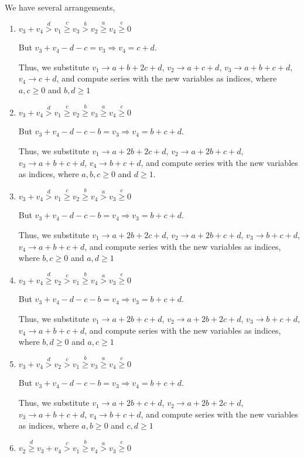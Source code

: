\documentclass{article}
\begin{document}
We have several arrangements,
\begin{enumerate}
    \item 
$v_3+v_4\overset{d}{>}v_1\overset{c}{\geq}v_3\overset{b}{>}{v_2}\overset{a}{\geq}v_4\overset{e}{\geq}{0}$

But $v_3+v_4-d-c=v_3\Rightarrow{v_4=c+d}.$

Thus, we substitute $v_1\rightarrow{a+b+2c+d}$, $v_2\rightarrow{a+c+d}$, $v_3\rightarrow{a+b+c+d}$, $v_4\rightarrow{c+d}$, and compute series with the new variables as indices, where $a,c\geq{0}$ and $b,d\geq{1}$  
    \item 
$v_3+v_4\overset{d}{>}v_1\overset{c}{\geq}v_2\overset{b}{\geq}{v_3}\overset{a}{\geq}v_4\overset{e}{\geq}{0}$

But $v_3+v_4-d-c-b=v_3\Rightarrow{v_4=b+c+d}.$

Thus, we substitute $v_1\rightarrow{a+2b+2c+d}$, $v_2\rightarrow{a+2b+c+d}$, $v_3\rightarrow{a+b+c+d}$, $v_4\rightarrow{b+c+d}$, and compute series with the new variables as indices, where $a,b,c\geq{0}$ and $d\geq{1}$.  
    \item 
$v_3+v_4\overset{d}{>}v_1\overset{c}{\geq}v_2\overset{b}{\geq}{v_4}\overset{a}{>}v_3\overset{e}{\geq}{0}$

But $v_3+v_4-d-c-b=v_4\Rightarrow{v_3=b+c+d}.$

Thus, we substitute $v_1\rightarrow{a+2b+2c+d}$, $v_2\rightarrow{a+2b+c+d}$, $v_3\rightarrow{b+c+d}$, $v_4\rightarrow{a+b+c+d}$, and compute series with the new variables as indices, where $b,c\geq{0}$ and $a,d\geq{1}$
    \item 
$v_3+v_4\overset{d}{\geq}v_2\overset{c}{>}v_1\overset{b}{\geq}{v_4}\overset{a}{>}v_3\overset{e}{\geq}{0}$

But $v_3+v_4-d-c-b=v_4\Rightarrow{v_3=b+c+d}.$

Thus, we substitute $v_1\rightarrow{a+2b+c+d}$, $v_2\rightarrow{a+2b+2c+d}$, $v_3\rightarrow{b+c+d}$, $v_4\rightarrow{a+b+c+d}$, and compute series with the new variables as indices, where $b,d\geq{0}$ and $a,c\geq{1}$
    \item 
$v_3+v_4\overset{d}>v_2\overset{c}{>}v_1\overset{b}{\geq}{v_3}\overset{a}{\geq}v_4\overset{e}{\geq}{0}$

But $v_3+v_4-d-c-b=v_3\Rightarrow{v_4=b+c+d}.$

Thus, we substitute $v_1\rightarrow{a+2b+c+d}$, $v_2\rightarrow{a+2b+2c+d}$, $v_3\rightarrow{a+b+c+d}$, $v_4\rightarrow{b+c+d}$, and compute series with the new variables as indices, where $a,b\geq{0}$ and $c,d\geq{1}$
    \item 
$v_2\overset{d}{\geq}v_3+v_4\overset{c}{>}v_1\overset{b}{\geq}{v_4}\overset{a}{>}v_3\overset{e}{\geq}{0}$


\end{enumerate}
\end{document}
